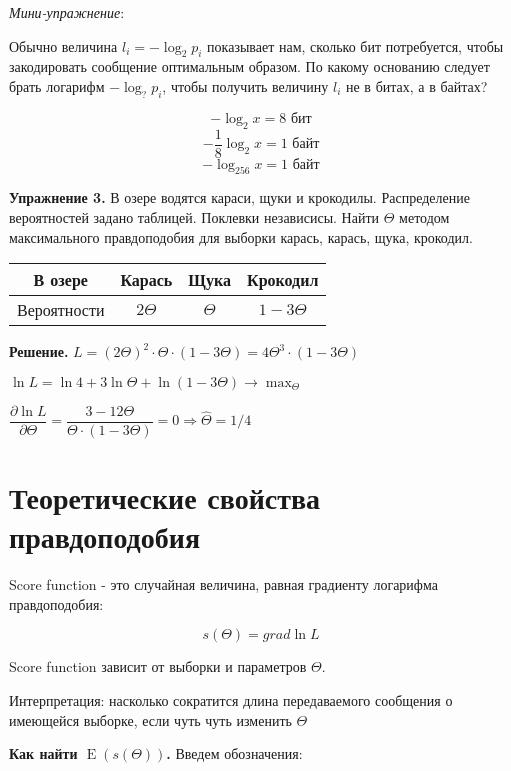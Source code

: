 \documentclass[12pt]{article} %
\theoremstyle{definition} %
\DeclareMathOperator{\E}{E}
\begin{document}
    \textit{Мини-упражнение}:
    
    Обычно величина $l_i=-\log_2 p_i$ показывает нам, сколько бит потребуется, чтобы закодировать сообщение оптимальным образом. По какому основанию следует брать логарифм $-\log_? p_i$, чтобы получить величину $l_i$ не в битах, а в байтах?
    
    $$-\log_2x = 8 \text{ бит}$$
    $$-\dfrac{1}{8}\log_2x = 1 \text{ байт}$$
    $$-\log_{256}x = 1 \text{ байт}$$
    
    \textbf{Упражнение 3.} В озере водятся караси, щуки и крокодилы. Распределение вероятностей задано таблицей. Поклевки независисы. Найти $\Theta$ методом максимального правдоподобия для выборки карась, карась, щука, крокодил.
    
    \begin{table}[!hbt]
		\begin{center}
		\label{tab:simParameters}
		\begin{tabular}{cccc}
			\hline
			В озере & Карась & Щука & Крокодил \\
			\hline
			Вероятности & $2\Theta$ & $\Theta$ & $1 - 3\Theta$ \\
			\hline
		\end{tabular}
		\end{center}
	\end{table}

    \textbf{Решение.}
    $L = (2\Theta)^{2}\cdot\Theta\cdot(1 - 3\Theta) = 4\Theta^{3}\cdot(1 - 3\Theta)$ 
    
    $\ln L = \ln 4 + 3\ln \Theta + \ln (1 - 3\Theta) \rightarrow \max_\Theta$ 
    
    $\dfrac{\partial\ln L}{\partial\Theta} = \dfrac{3-12\Theta}{\Theta\cdot(1 - 3\Theta)} = 0 \Rightarrow \hat{\Theta} = 1/4$
    
\section{Теоретические свойства правдоподобия}
    Score function - это случайная величина, равная градиенту логарифма правдоподобия:
    
    \[
    s(\Theta) = grad \ln L
    \]
    
    Score function зависит от выборки и параметров $\Theta$. 
    
    Интерпретация: насколько сократится длина передаваемого сообщения о имеющейся выборке, если чуть чуть изменить $\Theta$ 
    
    \textbf{Как найти $\E(s(\Theta))$.}
    Введем обозначения: 
    
\end{document}
